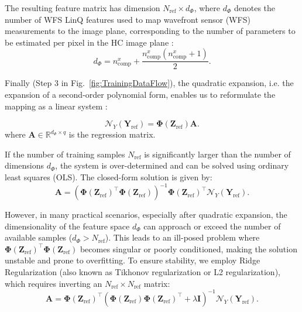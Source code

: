 The resulting feature matrix has dimension
\(
N_{\mathrm{ref}} \times d_\Phi
\),
where \(d_\Phi\) denotes the number of WFS LinQ features used to map wavefront sensor (WFS) measurements to the image plane, corresponding to the number of parameters to be estimated per pixel in the HC image plane : 
\begin{equation}
d_\Phi =
n_{\mathrm{comp}}^x +
\frac{n_{\mathrm{comp}}^x \left(n_{\mathrm{comp}}^x+1\right)}{2}.
\end{equation}

Finally (Step 3 in Fig.~\ref{fig:TrainingDataFlow}), the quadratic expansion, i.e. the expansion of a second-order polynomial form, enables us to reformulate the mapping as a linear system :

\begin{equation}
\mathcal{N}_Y(\mathbf{Y}_{\mathrm{ref}}) = \mathbf{\Phi}(\mathbf{Z}_{\mathrm{ref}}) \mathbf{A}.
\end{equation}
where $\mathbf{A} \in \mathbb{R}^{d_\Phi \times q}$ %
is the regression matrix. 

If the number of training samples $N_{\mathrm{ref}}$ is significantly larger than the number of dimensions $d_\Phi$, the system is over-determined and can be solved using ordinary least squares (OLS). The closed-form solution is given by:
\begin{equation}
\mathbf{A} = \left( \mathbf{\Phi}(\mathbf{Z}_{\mathrm{ref}})^\top \mathbf{\Phi}(\mathbf{Z}_{\mathrm{ref}}) \right)^{-1} \mathbf{\Phi}(\mathbf{Z}_{\mathrm{ref}})^\top \mathcal{N}_Y(\mathbf{Y}_{\mathrm{ref}}).
\end{equation}

However, in many practical scenarios, especially after quadratic expansion, the dimensionality of the feature space $d_\Phi$ can approach or exceed the number of available samples ($d_\Phi > N_{\mathrm{ref}}$). This leads to an ill-posed problem where $\mathbf{\Phi}(\mathbf{Z}_{\mathrm{ref}})^\top \mathbf{\Phi}(\mathbf{Z}_{\mathrm{ref}})$ becomes singular or poorly conditioned, making the solution unstable and prone to overfitting. To ensure stability, we employ Ridge Regularization (also known as Tikhonov regularization or L2 regularization)\cite{HoerlKennard1970}, which requires inverting an $N_{\mathrm{ref}} \times N_{\mathrm{ref}}$ matrix:
\begin{equation}
\mathbf{A} = \mathbf{\Phi}(\mathbf{Z}_{\mathrm{ref}})^\top \left( \mathbf{\Phi}(\mathbf{Z}_{\mathrm{ref}}) \mathbf{\Phi}(\mathbf{Z}_{\mathrm{ref}})^\top + \lambda \mathbf{I} \right)^{-1} \mathcal{N}_Y(\mathbf{Y}_{\mathrm{ref}}).
\end{equation}

